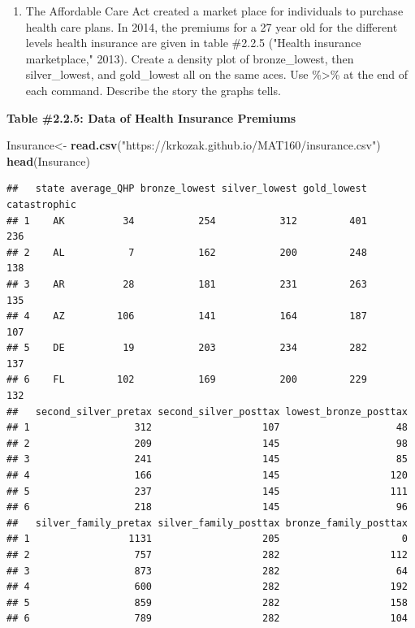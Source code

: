 \documentclass[]{book}
\newenvironment{Shaded}{\begin{snugshade}}{\end{snugshade}}
\newcommand{\KeywordTok}[1]{\textcolor[rgb]{0.13,0.29,0.53}{\textbf{#1}}}
\newcommand{\NormalTok}[1]{#1}
\newcommand{\StringTok}[1]{\textcolor[rgb]{0.31,0.60,0.02}{#1}}
\providecommand{\tightlist}{%
  \setlength{\itemsep}{0pt}\setlength{\parskip}{0pt}}
\begin{document}
\begin{enumerate}
\def\labelenumi{\arabic{enumi}.}
\setcounter{enumi}{2}
\tightlist
\item
  The Affordable Care Act created a market place for individuals to purchase health care plans. In 2014, the premiums for a 27 year old for the different levels health insurance are given in table \#2.2.5 ("Health insurance marketplace," 2013). Create a density plot of bronze\_lowest, then silver\_lowest, and gold\_lowest all on the same aces. Use \%\textgreater{}\% at the end of each command. Describe the story the graphs tells.
\end{enumerate}

\textbf{Table \#2.2.5: Data of Health Insurance Premiums}

\begin{Shaded}
\begin{Highlighting}[]
\NormalTok{Insurance<-}\StringTok{ }\KeywordTok{read.csv}\NormalTok{(}\StringTok{"https://krkozak.github.io/MAT160/insurance.csv"}\NormalTok{)}
\KeywordTok{head}\NormalTok{(Insurance)}
\end{Highlighting}
\end{Shaded}

\begin{verbatim}
##   state average_QHP bronze_lowest silver_lowest gold_lowest catastrophic
## 1    AK          34           254           312         401          236
## 2    AL           7           162           200         248          138
## 3    AR          28           181           231         263          135
## 4    AZ         106           141           164         187          107
## 5    DE          19           203           234         282          137
## 6    FL         102           169           200         229          132
##   second_silver_pretax second_silver_posttax lowest_bronze_posttax
## 1                  312                   107                    48
## 2                  209                   145                    98
## 3                  241                   145                    85
## 4                  166                   145                   120
## 5                  237                   145                   111
## 6                  218                   145                    96
##   silver_family_pretax silver_family_posttax bronze_family_posttax
## 1                 1131                   205                     0
## 2                  757                   282                   112
## 3                  873                   282                    64
## 4                  600                   282                   192
## 5                  859                   282                   158
## 6                  789                   282                   104
\end{verbatim}
\end{document}
